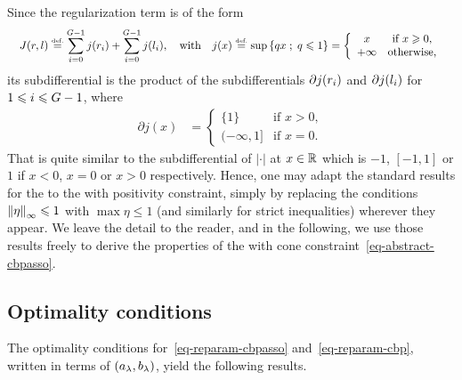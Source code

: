 Since the regularization term is of the form 
\begin{align*}
  \quad J(r,l) &\stackrel{\mbox{\upshape\tiny def.}}{=} 
  \sum_{i=0}^{G-1} j(r_i) + \sum_{i=0}^{G-1}j(l_i),   \quad \text{with} \quad j(x) \stackrel{\mbox{\upshape\tiny def.}}{=} \sup 
  	\left\{  qx  \;;\; q\leqslant 1 \right\} = 
	\left\{
		\begin{array}{cc}x & \mbox{if } x\geqslant 0,\\+\infty &\mbox{otherwise,}\end{array}
	\right.
\end{align*}
its subdifferential is the product of the subdifferentials $\partial j(r_i)$ and $\partial j(l_i)$ for $1\leqslant i\leqslant G-1$, where
\begin{align*}
\partial j(x)&=\left\{\begin{array}{cc}\{1\} & \mbox{if } x> 0,\\ (-\infty, 1] &\mbox{if } x=0.\end{array}\right.
\end{align*}
That is quite similar to the subdifferential of $|\cdot|$ at $x\in \mathbb{R}$ which is $-1$, $[-1,1]$ or $1$ if $x<0$, $x=0$ or $x>0$ respectively. Hence, one may adapt the standard results for the \lasso to the \lasso with positivity constraint, simply by replacing the conditions $\left\lVert \eta \right\rVert_{\infty}\leqslant 1$ with $\max \eta \leq 1$ (and similarly for strict inequalities) wherever they appear. We leave the detail to the reader, and in the following, we use those results freely to derive the properties of the \lasso with cone constraint~\eqref{eq-abstract-cbpasso}.


\subsection{Optimality conditions}
The optimality conditions for~\eqref{eq-reparam-cbpasso} and~\eqref{eq-reparam-cbp}, written in terms of $(a_\lambda,b_\lambda)$, yield the following results.

